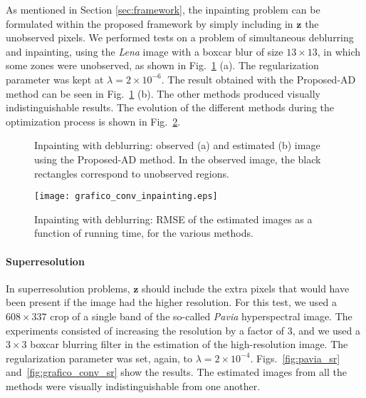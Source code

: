 \documentclass[10pt,twocolumn,twoside]{IEEEtran}
\newcommand{\z}{\mathbf{z}} %
\begin{document}
As mentioned in Section \ref{sec:framework}, the inpainting problem can be formulated within the proposed framework by simply including in $\z$ the unobserved pixels. We performed tests on a problem of simultaneous deblurring and inpainting, using the \emph{Lena} image with a boxcar blur of size $13 \times 13$, in which some zones were unobserved, as shown in Fig.~\ref{fig:lena_inpainting} (a). The regularization parameter was kept at $\lambda = 2 \times 10^{-6}$. The result obtained with the Proposed-AD method can be seen in Fig.~\ref{fig:lena_inpainting} (b). The other methods produced visually indistinguishable results. The evolution of the different methods during the optimization process is shown in Fig.~\ref{fig:grafico_conv_inpainting}.

\begin{figure}[!t]
	\centering
	\hfil
	\caption{Inpainting with deblurring: observed (a) and estimated (b) image using the Proposed-AD method. In the observed image, the black rectangles correspond to unobserved regions.}
	\label{fig:lena_inpainting}
\end{figure}

\begin{figure}[!t]
	\centering
	\texttt{[image: grafico\_conv\_inpainting.eps]}%
	\caption{Inpainting with deblurring: RMSE of the estimated images as a function of running time, for the various methods.}
	\label{fig:grafico_conv_inpainting}
\end{figure}

\paragraph{Superresolution} In superresolution problems, $\z$ should include the extra pixels that would have been present if the image had the higher resolution. For this test, we used a $608 \times 337$ crop of a single band of the so-called \emph{Pavia} hyperspectral image. The experiments consisted of increasing the resolution by a factor of 3, and we used a $3 \times 3$ boxcar blurring filter in the estimation of the high-resolution image. The regularization parameter was set, again, to $\lambda = 2 \times 10^{-4}$. Figs.~\ref{fig:pavia_sr} and~\ref{fig:grafico_conv_sr} show the results. The estimated images from all the methods were visually indistinguishable from one another.
\end{document}
